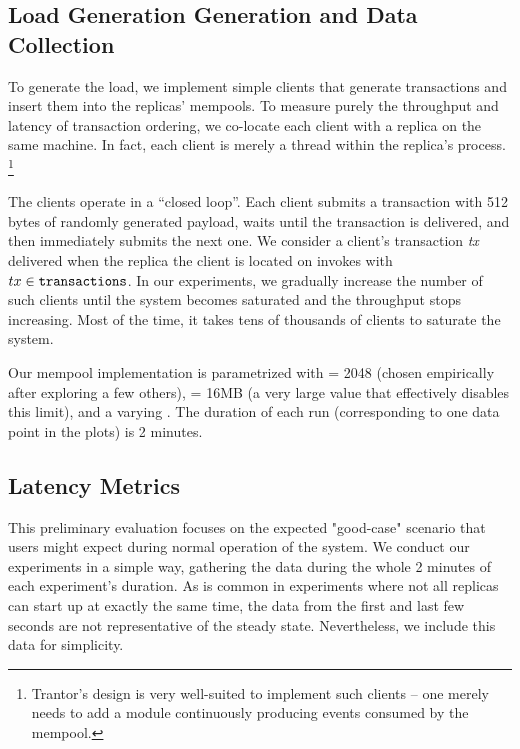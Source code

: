 \documentclass{article}
\begin{document}
\subsection{Load Generation Generation and Data Collection}

To generate the load, we implement simple clients that generate transactions and insert them into the replicas' mempools.
To measure purely the throughput and latency of transaction ordering, we co-locate each client with a replica on the same machine.
In fact, each client is merely a thread within the replica's process.%
\footnote{Trantor's design is very well-suited to implement such clients --
one merely needs to add a module continuously producing  events consumed by the mempool.}

The clients operate in a “closed loop”.
Each client submits a transaction with 512 bytes of randomly generated payload, waits until the transaction is delivered, and then immediately submits the next one.
We consider a client's transaction \textit{tx} delivered when the replica the client is located on invokes  with $tx \in \texttt{transactions}$.
In our experiments, we gradually increase the number of such clients until the system becomes saturated and the throughput stops increasing.
Most of the time, it takes tens of thousands of clients to saturate the system.

Our mempool implementation is parametrized with  = 2048 (chosen empirically after exploring a few others),
 = 16MB (a very large value that effectively disables this limit), and a varying .
The duration of each run (corresponding to one data point in the plots) is 2 minutes.

\subsection{Latency Metrics}

This preliminary evaluation focuses on the expected "good-case" scenario that users might expect during normal operation of the system.
We conduct our experiments in a simple way, gathering the data during the whole 2 minutes of each experiment's duration.
As is common in experiments where not all replicas can start up at exactly the same time,
the data from the first and last few seconds are not representative of the steady state.
Nevertheless, we include this data for simplicity.
\end{document}
